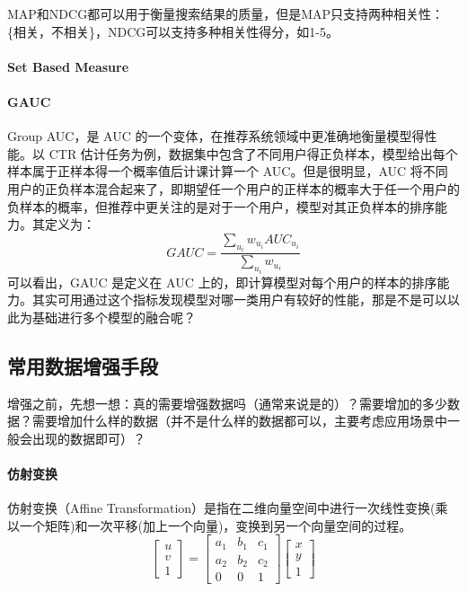 MAP和NDCG都可以用于衡量搜索结果的质量，但是MAP只支持两种相关性：\{相关，不相关\}，NDCG可以支持多种相关性得分，如1-5。

\paragraph{Set Based Measure}

\paragraph{GAUC}Group AUC，是 AUC 的一个变体，在推荐系统领域中更准确地衡量模型得性能。以 CTR 估计任务为例，数据集中包含了不同用户得正负样本，模型给出每个样本属于正样本得一个概率值后计课计算一个 AUC。但是很明显，AUC 将不同用户的正负样本混合起来了，即期望任一个用户的正样本的概率大于任一个用户的负样本的概率，但推荐中更关注的是对于一个用户，模型对其正负样本的排序能力。其定义为：
$$
GAUC = \frac{\sum_{u_i} w_{u_i} AUC_{u_i}}{\sum_{u_i} w_{u_i}}
$$
可以看出，GAUC 是定义在 AUC 上的，即计算模型对每个用户的样本的排序能力。其实可用通过这个指标发现模型对哪一类用户有较好的性能，那是不是可以以此为基础进行多个模型的融合呢？

\subsection{常用数据增强手段}
增强之前，先想一想：真的需要增强数据吗（通常来说是的）？需要增加的多少数据？需要增加什么样的数据（并不是什么样的数据都可以，主要考虑应用场景中一般会出现的数据即可）？
\paragraph{仿射变换}
仿射变换（Affine Transformation）是指在二维向量空间中进行一次线性变换(乘以一个矩阵)和一次平移(加上一个向量)，变换到另一个向量空间的过程。
$$
\left[\begin{array}{l}
	u \\
	v \\
	1
\end{array}\right]=\left[\begin{array}{ccc}
	a_{1} & b_{1} & c_{1} \\
	a_{2} & b_{2} & c_{2} \\
	0 & 0 & 1
\end{array}\right]\left[\begin{array}{l}
	x \\
	y \\
	1
\end{array}\right]
$$

